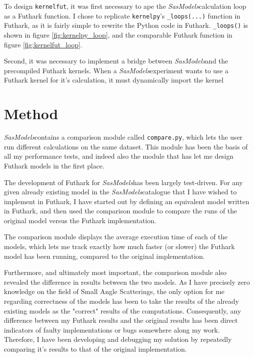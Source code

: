 \documentclass[11pt]{article}
\newcommand{\sasmodels}{\textit{SasModels}}
\begin{document}
To design \texttt{kernelfut}, it was first necessary to ape the 
\sasmodels calculation loop as a Futhark function. 
I chose to replicate \texttt{kernelpy}'s \texttt{\_loops(...)} function in 
Futhark, as it is fairly simple to rewrite the Python code in Futhark.
\texttt{\_loops()} is shown in figure \ref{fig:kernelpy_loop}, and the
comparable Futhark function in figure \ref{fig:kernelfut_loop}.

Second, it was necessary to implement a bridge between \sasmodels and the 
precompiled Futhark kernels. 
When a \sasmodels experiment wants to use a Futhark kernel for it's calculation, it must dynamically import the kernel


\section{Method}

\sasmodels contains a comparison module called \texttt{compare.py}, which
lets the user run different calculations on the same dataset.
This module has been the basis of all my performance tests, and indeed also
the module that has let me design Futhark models in the first place.

The development of Futhark for \sasmodels has been largely test-driven.
For any given already existing model in the \sasmodels catalogue that I have
wished to implement in Futhark, I have started out by defining an equivalent
model written in Futhark, and then used the comparison module to compare the
 runs of the original model versus the Futhark implementation.

The comparison module displays the average execution time of each of the models,
which lets me track exactly how much faster (or slower) the Futhark model has
been running, compared to the original implementation.

Furthermore, and ultimately most important, the comparison module also
revealed the difference in results between the two models. 
As I have precisely zero knowledge on the field of Small Angle Scatterings, 
the only option for me regarding correctness of the models has been to take
the results of the already existing models as the "correct" results of the
computations. Consequently, any difference between my Futhark results and the
original results has been direct indicators of faulty implementations or bugs
somewhere along my work.
Therefore, I have been developing and debugging my solution by repeatedly
comparing it's results to that of the original implementation.
\end{document}
